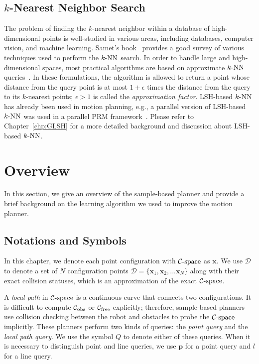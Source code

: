 \subsection{$k$-Nearest Neighbor Search}
The problem of finding the $k$-nearest neighbor within a database of high-dimensional points is well-studied in various areas, including databases, computer vision, and machine learning. Samet's book~\cite{Samet:2005:FMM} provides a good survey of various techniques used to perform the $k\text{-NN}$ search. In order to handle large and high-dimensional spaces, most practical algorithms are based on approximate $k\text{-NN}$ queries~\cite{Chakrabarti:FOCS}. In these formulations, the algorithm is allowed to return a point whose distance from the query point is at most $1+\epsilon$ times the distance from the query to its $k$-nearest points; $\epsilon > 1$ is called the \emph{approximation factor}. LSH-based $k\text{-NN}$ has already been used in motion planning, e.g., a parallel version of LSH-based $k\text{-NN}$ was used in a parallel PRM framework~\cite{Pan:IROS:2010}. Please refer to Chapter~\ref{chp:GLSH} for a more detailed background and discussion about LSH-based $k\text{-NN}$.



\section{Overview}
\label{sec:3:overview}
In this section, we give an overview of the sample-based planner and provide a brief background on the learning algorithm we used to improve the motion planner.


\subsection{Notations and Symbols}
In this chapter, we denote each point configuration with $\mathcal C\text{-space}$ as $\mathbf x$. We use $\mathcal D$ to denote a set of $N$ configuration points $\mathcal D = \{\mathbf x_1, \mathbf x_2, ... \mathbf x_N\}$ along with their exact collision statuses, which is an approximation of the exact $\mathcal C\text{-space}$.

A \emph{local path} in $\mathcal C\text{-space}$ is a continuous curve that connects two configurations.
It is difficult to compute $\mathcal C_{\text{obs}}$ or $\mathcal C_{\text{free}}$ explicitly; therefore, sample-based planners use collision checking between the robot and obstacles to probe the $\mathcal C\text{-space}$ implicitly. These planners perform two kinds of queries: the \emph{point query} and the \emph{local path query}. We use the symbol $Q$ to denote either of these queries. When it is necessary to distinguish point and line queries, we use $\mathbf p$ for a point query and $l$ for a line query.

